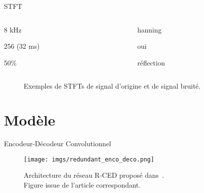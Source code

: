 \documentclass{beamer}
\begin{document}
\begin{frame}[fragile]{STFT}
\begin{columns}
    \begin{column}{0.5\textwidth}
        \scriptsize{%
        \begin{description}[align=right, leftmargin=*, labelindent=2.5cm]
            \item[fréquence :] 8 kHz
            \item[nfft :] 256 (32 ms)
            \item[overlap :] 50\%
        \end{description}}
    \end{column}%
    \hfill%
    \begin{column}{0.5\textwidth}
        \scriptsize{%
        \begin{description}[align=right, leftmargin=*, labelindent=2.5cm]
            \item[apodisation :] hanning
            \item[centrage :] oui
            \item[padding :] réflection
        \end{description}}
    \end{column}%
\end{columns}
\begin{figure}[]
    \centering
    \hfill%
    \captionsetup{justification=centering,margin=0cm}
    \caption{Exemples de STFTs de signal d'origine et de signal bruité.}
    \label{fig:loss_plot}
\end{figure}
\end{frame}










\section{Modèle}

\begin{frame}{Encodeur-Décodeur Convolutionnel}
\begin{figure}[H]
    \centering
    \texttt{[image: imgs/redundant\_enco\_deco.png]}
    \captionsetup{justification=centering,margin=0cm}
    \caption{Architecture du réseau R-CED proposé dans~\cite{park2017}. \\ \tiny{Figure issue de l'article correspondant.}}
    \label{fig:RCED_architecture}
\end{figure}
\end{frame}
\end{document}
